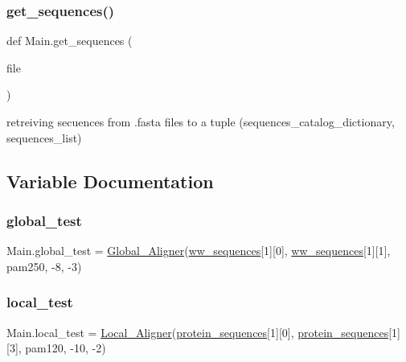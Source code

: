 \subsubsection{\texorpdfstring{get\+\_\+sequences()}{get\_sequences()}}
{\footnotesize\ttfamily def Main.\+get\+\_\+sequences (\begin{DoxyParamCaption}\item[{}]{file }\end{DoxyParamCaption})}

\begin{DoxyVerb}retreiving secuences from .fasta files to a tuple
(sequences_catalog_dictionary, sequences_list)
\end{DoxyVerb}
 

\subsection{Variable Documentation}
\mbox{\label{namespace_main_a027017501a6249c536a21b55ab4ff57d}} 
\subsubsection{\texorpdfstring{global\+\_\+test}{global\_test}}
{\footnotesize\ttfamily Main.\+global\+\_\+test = \hyperlink{class_aligners_1_1_global___aligner}{Global\+\_\+\+Aligner}(\hyperlink{namespace_main_ad0e687821118d10a87cd81cdb0597636}{ww\+\_\+sequences}\mbox{[}1\mbox{]}\mbox{[}0\mbox{]}, \hyperlink{namespace_main_ad0e687821118d10a87cd81cdb0597636}{ww\+\_\+sequences}\mbox{[}1\mbox{]}\mbox{[}1\mbox{]}, pam250, -\/8, -\/3)}

\mbox{\label{namespace_main_a855511465ef4b71860406d664b6b7f61}} 
\subsubsection{\texorpdfstring{local\+\_\+test}{local\_test}}
{\footnotesize\ttfamily Main.\+local\+\_\+test = \hyperlink{class_aligners_1_1_local___aligner}{Local\+\_\+\+Aligner}(\hyperlink{namespace_main_a0f7dfdcfc82e28e54d2d9b4355d51c6a}{protein\+\_\+sequences}\mbox{[}1\mbox{]}\mbox{[}0\mbox{]}, \hyperlink{namespace_main_a0f7dfdcfc82e28e54d2d9b4355d51c6a}{protein\+\_\+sequences}\mbox{[}1\mbox{]}\mbox{[}3\mbox{]}, pam120, -\/10, -\/2)}

